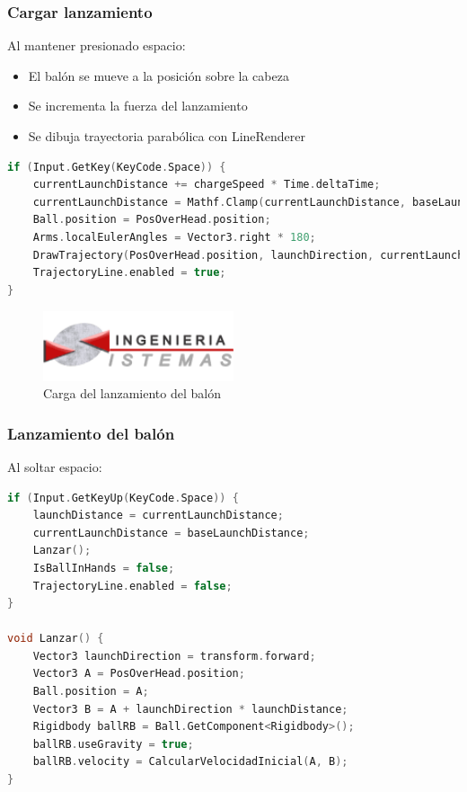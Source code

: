 \subsubsection{Cargar lanzamiento}
Al mantener presionado espacio:
\begin{itemize}
    \item El balón se mueve a la posición sobre la cabeza
    \item Se incrementa la fuerza del lanzamiento
    \item Se dibuja trayectoria parabólica con LineRenderer
\end{itemize}

\begin{lstlisting}[language=C++]
if (Input.GetKey(KeyCode.Space)) {
    currentLaunchDistance += chargeSpeed * Time.deltaTime;
    currentLaunchDistance = Mathf.Clamp(currentLaunchDistance, baseLaunchDistance, maxLaunchDistance);
    Ball.position = PosOverHead.position;
    Arms.localEulerAngles = Vector3.right * 180;
    DrawTrajectory(PosOverHead.position, launchDirection, currentLaunchDistance, maxHeight);
    TrajectoryLine.enabled = true;
}
\end{lstlisting}

\begin{figure}[h]
    \centering
    \includegraphics[width=0.5\textwidth]{img/epis.png}
    \caption{Carga del lanzamiento del balón}
    \label{fig:cargar}
\end{figure}

\subsubsection{Lanzamiento del balón}
Al soltar espacio:
\begin{lstlisting}[language=C++]
if (Input.GetKeyUp(KeyCode.Space)) {
    launchDistance = currentLaunchDistance;
    currentLaunchDistance = baseLaunchDistance;
    Lanzar();
    IsBallInHands = false;
    TrajectoryLine.enabled = false;
}

void Lanzar() {
    Vector3 launchDirection = transform.forward;
    Vector3 A = PosOverHead.position;
    Ball.position = A;
    Vector3 B = A + launchDirection * launchDistance;
    Rigidbody ballRB = Ball.GetComponent<Rigidbody>();
    ballRB.useGravity = true;
    ballRB.velocity = CalcularVelocidadInicial(A, B);
}
\end{lstlisting}

